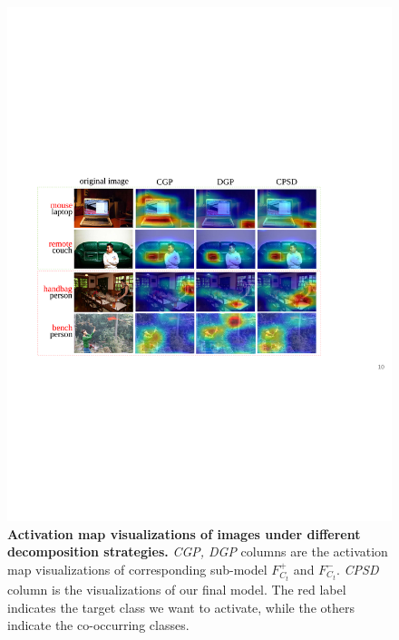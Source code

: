 \documentclass{article}
\begin{document}
\begin{figure}[t]
    \centering
    \includegraphics[width=1\columnwidth]{figure/heatmap.pdf}
    \vspace{-0.6cm}
    \caption{\textbf{Activation map visualizations of images under different decomposition strategies.}
    \emph{CGP, DGP} columns are the activation map visualizations of corresponding sub-model $F_{C_t}^+$ and $F_{C_t}^-$.
    \emph{CPSD} column is the visualizations of our final model.
    The red label indicates the target class we want to activate, while the others indicate the co-occurring classes.
    }
    \label{fig4}
    \vspace{-0.4cm}
\end{figure}
\end{document}
